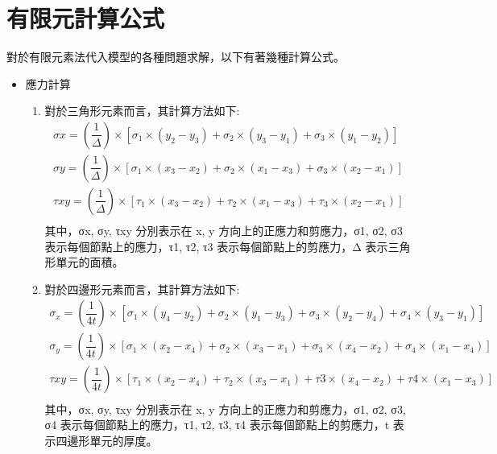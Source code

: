 \section{有限元計算公式}
對於有限元素法代入模型的各種問題求解，以下有著幾種計算公式。

\begin{itemize}
\item 應力計算

\begin{enumerate}
\item 對於三角形元素而言，其計算方法如下:\\
\[
\begin{aligned}
\sigma x=\left( \dfrac{1}{\Delta }\right) \times \left[ \sigma _{1}\times \left( y_{2}-y_{3}\right) +\sigma _{2}\times \left( y_{3}-y_{1}\right) +\sigma _{3}\times \left( y_{1}-y_{2}\right) \right]\\
\sigma y=\left( \dfrac{1}{\Delta }\right) \times \left[ \sigma _{1}\times \left( x_{3}-x_{2}\right) +\sigma _{2}\times \left( x_{1}-x_{3}\right) +\sigma _{3}\times \left( x_{2}-x_{1}\right) \right]\\
\tau xy=\left( \dfrac{1}{\Delta }\right) \times \left[ \tau _{1}\times \left( x_{3}-x_{2}\right) +\tau _{2}\times \left( x_{1}-x_{3}\right) +\tau _{3}\times \left( x_{2}-x_{1}\right) \right]\\
\end{aligned}
\]
其中，σx, σy, τxy 分別表示在 x, y 方向上的正應力和剪應力，σ1, σ2, σ3 表示每個節點上的應力，τ1, τ2, τ3 表示每個節點上的剪應力，Δ 表示三角形單元的面積。\\

\item 對於四邊形元素而言，其計算方法如下:\\
\[
\begin{aligned}
\sigma _{x}=\left( \dfrac{1}{4t}\right) \times \left[ \sigma _{1}\times \left( y_{4}-y_{2}\right) +\sigma _{2}\times \left( y_{1}-y_{3}\right) +\sigma _{3}\times \left( y_{2}-y_{4}\right) +\sigma _{4}\times \left( y_{3}-y_{1}\right) \right]\\
\sigma _{y}=\left( \dfrac{1}{4t}\right) \times \left[ \sigma _{1}\times \left( x_{2}-x_{4}\right) +\sigma _{2}\times \left( x_{3}-x_{1}\right) +\sigma _{3}\times \left( x_{4}-x_{2}\right) +\sigma _{4}\times \left( x_{1}-x_{4}\right) \right]\\
\tau xy=\left( \dfrac{1}{4t}\right) \times \left[ \tau _{1}\times \left( x_{2}-x_{4}\right) +\tau _{2}\times \left( x_{3}-x_{1}\right) +\tau 3\times \left( x_{4}-x_{2}\right) +\tau 4\times \left( x_{1}-x_{3}\right) \right]\\
\end{aligned}
\]
其中，σx, σy, τxy 分別表示在 x, y 方向上的正應力和剪應力，σ1, σ2, σ3, σ4 表示每個節點上的應力，τ1, τ2, τ3, τ4 表示每個節點上的剪應力，t 表示四邊形單元的厚度。
\end{enumerate}
\newpage


\end{itemize}
